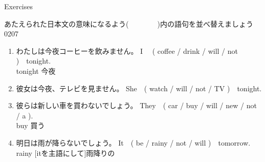 \documentclass[aspectratio=169,xcolor={dvipsnames,table}]{beamer}
\newcommand{\myaudio}[1]{\href{#1}{\faVolumeUp}}
\begin{document}
\begin{frame}[plain]{Exercises}

{\small あたえられた日本文の意味になるよう(~~~~~~~~)内の語句を並べ替えましょう}%
\mbox{}\hfill{\tiny 0207}\,{\scriptsize \myaudio{./audio/012_will_05.mp3}}

\begin{enumerate}
 \item わたしは今夜コーヒーを飲みません。
 \hfill{}I ~~( coffee / drink / will / not )~~tonight.\\
\hfill{\scriptsize tonight  今夜}
 \item 彼女は今夜、テレビを見ません。\hfill{}%
She~~( watch / will / not / TV )~~tonight.\\
 \item 彼らは新しい車を買わないでしょう。\hfill%
 They~~( car / buy / will / new / not / a ).\\
\hfill{\scriptsize buy  買う}
 \item 明日は雨が降らないでしょう。\hfill{}
It~~( be / rainy / not / will )~~tomorrow.\\
\hfill{\scriptsize rainy   [itを主語にして]雨降りの}
\end{enumerate}

\end{frame}
\end{document}

